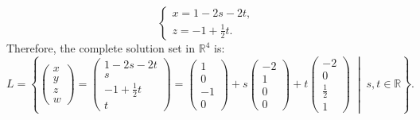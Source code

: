 \begin{exercisesolution*}
\[
\begin{cases}
x = 1 - 2s - 2t, \\
z = -1 + \frac{1}{2}t.
\end{cases}
\]
Therefore, the complete solution set in $\mathbb{R}^4$ is:
\[
L = \left\{ \begin{pmatrix} x \\ y \\ z \\ w \end{pmatrix} = \begin{pmatrix} 1 - 2s - 2t \\ s \\ -1 + \frac{1}{2}t \\ t \end{pmatrix} = \begin{pmatrix} 1 \\ 0 \\ -1 \\ 0 \end{pmatrix} + s \begin{pmatrix} -2 \\ 1 \\ 0 \\ 0 \end{pmatrix} + t \begin{pmatrix} -2 \\ 0 \\ \frac{1}{2} \\ 1 \end{pmatrix} \;\middle|\; s, t \in \mathbb{R} \right\}.
\]
\end{exercisesolution*}


